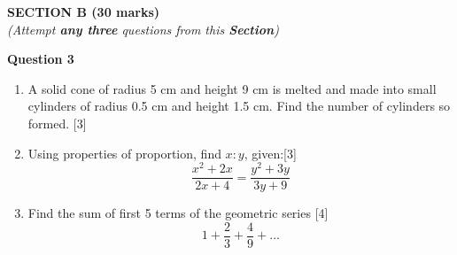 \newpage
\begin{center}
   \large
   \textbf{SECTION B (30 marks)}\\
   \vspace{5mm}
   \normalsize
   \textit{(Attempt \textbf{any three} questions from this \textbf{Section})}
\end{center}
\par

\noindent
\textbf{Question 3}
\begin{enumerate}[label=(\roman*)]

    \item A solid cone of radius 5 cm and height 9 cm is melted and made 
        into small cylinders of radius 0.5 cm and height 1.5 cm. Find 
        the number of cylinders so formed. \hfill [3]

    \item Using properties of proportion, find $x:y$, given:\hfill [3]
        \[
            \frac{x^2 + 2x}{2x + 4} = \frac{y^2 + 3y}{3y + 9}
        \]

    \item Find the sum of first 5 terms of the geometric series \hfill [4]
        \[
            1 + \frac23 + \frac49 + \dots
        \]

\end{enumerate}


